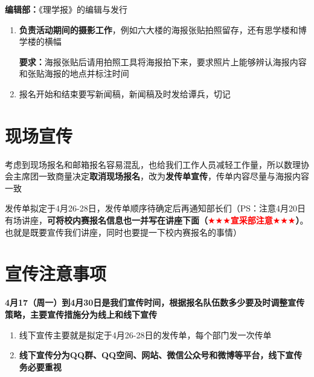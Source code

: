\documentclass[12pt]{ctexart}
\begin{document}
\textbf{编辑部：}《理学报》的编辑与发行
\begin{enumerate}
	\item \textbf{负责活动期间的摄影工作}，例如六大楼的海报张贴拍照留存，还有思学楼和博学楼的横幅
	
	\textbf{要求：}海报张贴后请用拍照工具将海报拍下来，要求照片上能够辨认海报内容和张贴海报的地点并标注时间
	\item 报名开始和结束要写新闻稿，新闻稿及时发给谭兵，切记
\end{enumerate}

\section{现场宣传}
\begin{proposition}[发传单宣传]

考虑到现场报名和邮箱报名容易混乱，也给我们工作人员减轻工作量，所以数理协会主席团一致商量决定\textbf{取消现场报名}，改为\textbf{发传单宣传}，传单内容尽量与海报内容一致
\end{proposition}

发传单拟定于4月26-28日，发传单顺序待确定后再通知部长们（PS：注意4月20日有场讲座，\textbf{可将校内赛报名信息也一并写在讲座下面（\textcolor{red}{$\bigstar\bigstar\bigstar$宣采部注意$\bigstar\bigstar\bigstar$}）}。也就是既要宣传我们讲座，同时也要提一下校内赛报名的事情）
\section{宣传注意事项}
\textbf{4月17（周一）到4月30日是我们宣传时间，根据报名队伍数多少要及时调整宣传策略，主要宣传措施分为线上和线下宣传}

\begin{enumerate}
\item 线下宣传主要就是拟定于4月26-28日的发传单，每个部门发一次传单
\item \textbf{线下宣传分为QQ群、QQ空间、网站、微信公众号和微博等平台，线下宣传务必要重视}
\end{enumerate}
\end{document}
